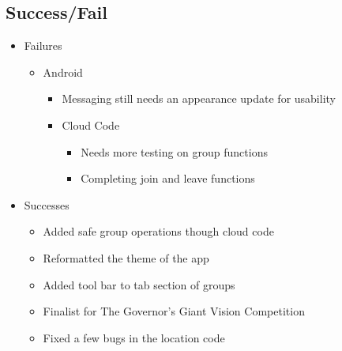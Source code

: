 \subsection{Success/Fail}
\begin{itemize}
	\item Failures
	\begin{itemize}
		\item Android
		\begin{itemize}
			\item Messaging still needs an appearance update for usability
		\end{itemize}
		\begin{itemize}
			\item Cloud Code
			\begin{itemize}	
				\item Needs more testing on group functions
				\item Completing join and leave functions
			\end{itemize}
		\end{itemize}
	\end{itemize}
	\item Successes
	\begin{itemize}
		\item Added safe group operations though cloud code
		\item Reformatted the theme of the app
		\item Added tool bar to tab section of groups
		\item Finalist for The Governor's Giant Vision Competition
		\item Fixed a few bugs in the location code
	\end{itemize}
\end{itemize}

